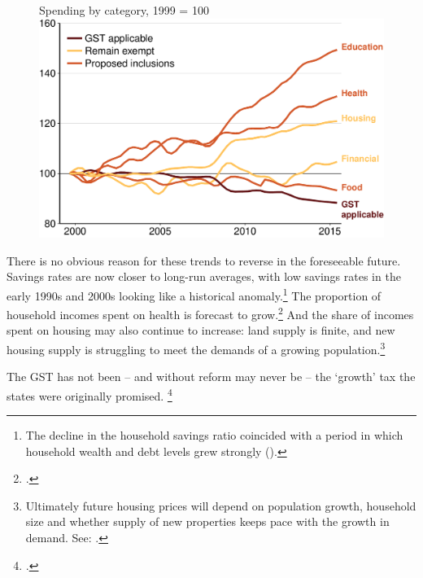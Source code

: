 \begin{figure}[!tp]
%
{Spending by category, 1999 = 100}
\includegraphics[width=\columnwidth]{atlas/Spending_less_on_GST_liable-1.pdf}

\end{figure}

There is no obvious reason for these trends to reverse in the foreseeable future. Savings rates are now closer to long-run averages, with low savings rates in the early 1990s and 2000s looking like a historical anomaly.\footnote{The decline in the household savings ratio coincided with a period in which household wealth and debt levels grew strongly (\textcite[][38]{PBO2014TrendsAustralianGovtReceipts1982to2013}).}  The proportion of household incomes spent on health is forecast to grow.\footcite[][28]{DaleyWoodWeidmannEtAl2014}  And the share of incomes spent on housing may also continue to increase: land supply is finite, and new housing supply is struggling to meet the demands of a growing population.\footnote{Ultimately future housing prices will depend on population growth, household size and whether supply of new properties keeps pace with the growth in demand. See: \textcite[][7]{RBA2014SubmissionAffordableHousingInquiry}.}

The GST has not been – and without reform may never be – the ‘growth’ tax the states were originally promised. \footcite{CostelloBudgetSpeech2000-01}

